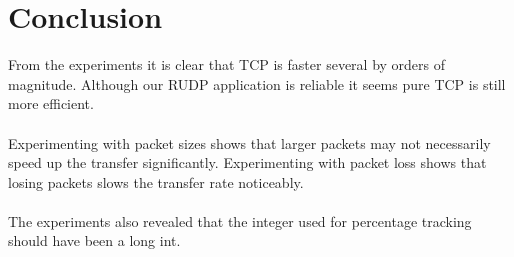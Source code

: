 \documentclass[a4paper,10pt]{article}
\begin{document}
\section{Conclusion}
From the experiments it is clear that TCP is faster several by orders of magnitude.
Although our RUDP application is reliable it seems pure TCP is still more
efficient.\\\\
Experimenting with packet sizes shows that larger packets may not necessarily
speed up the transfer significantly.
Experimenting with packet loss shows that losing packets slows the transfer
rate noticeably.\\\\
The experiments also revealed that the integer used for percentage tracking
should have been a long int.

\pagebreak


\end{document}
